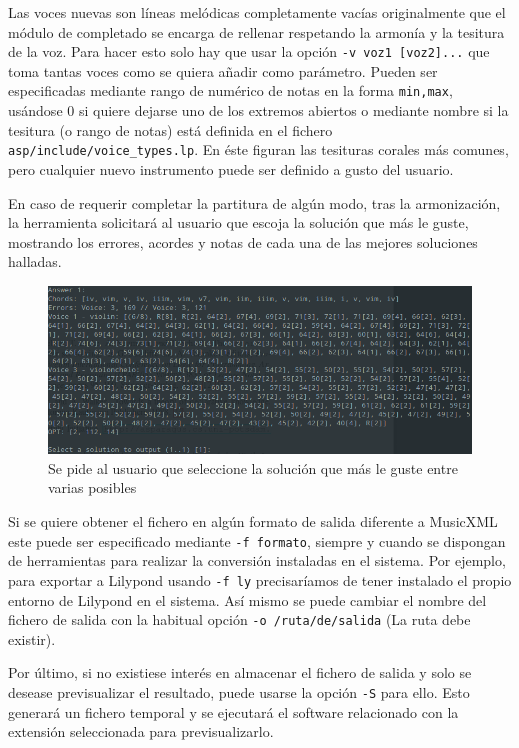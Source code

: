Las voces nuevas son líneas melódicas completamente vacías originalmente que el módulo de completado se encarga de rellenar respetando la armonía y la tesitura de la voz. Para hacer esto solo hay que usar la opción \texttt{-v voz1 [voz2]...} que toma tantas voces como se quiera añadir como parámetro. Pueden ser especificadas mediante rango de numérico de notas en la forma \texttt{min,max}, usándose 0 si quiere dejarse uno de los extremos abiertos o mediante nombre si la tesitura (o rango de notas) está definida en el fichero \texttt{asp/include/voice\_types.lp}. En éste figuran las tesituras corales más comunes, pero cualquier nuevo instrumento puede ser definido a gusto del usuario.

En caso de requerir completar la partitura de algún modo, tras la armonización, la herramienta solicitará al usuario que escoja la solución que más le guste, mostrando los errores, acordes y notas de cada una de las mejores soluciones halladas.

\begin{figure}
	\centering
	\includegraphics[width=0.8\linewidth]{imagenes/usage/completion_select.png}
	\caption{Se pide al usuario que seleccione la solución que más le guste entre varias posibles}
	\label{fig:usage_completion_select}
\end{figure}

Si se quiere obtener el fichero en algún formato de salida diferente a MusicXML este puede ser especificado mediante \texttt{-f formato}, siempre y cuando se dispongan de herramientas para realizar la conversión instaladas en el sistema. Por ejemplo, para exportar a Lilypond usando \texttt{-f ly} precisaríamos de tener instalado el propio entorno de Lilypond en el sistema. Así mismo se puede cambiar el nombre del fichero de salida con la habitual opción \texttt{-o /ruta/de/salida} (La ruta debe existir).

Por último, si no existiese interés en almacenar el fichero de salida y solo se desease previsualizar el resultado, puede usarse la opción \texttt{-S} para ello. Esto generará un fichero temporal y se ejecutará el software relacionado con la extensión seleccionada para previsualizarlo.

\newpage
\thispagestyle{empty}
